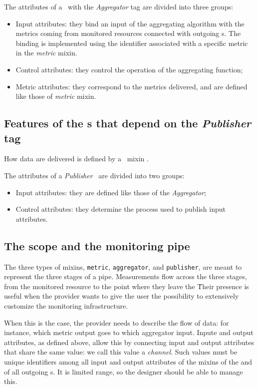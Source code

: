 \documentclass[10pt,a4paper]{article}
\begin{document}
The attributes of a \mi\ with the {\em Aggregator} tag are divided into three groups:

\begin{itemize}

\item Input attributes: they bind an input of the aggregating algorithm with the metrics coming from monitored resources connected with outgoing \coll s. The binding is implemented using the identifier associated with a specific metric in the {\em metric} mixin.
\item Control attributes: they control the operation of the aggregating function;
\item Metric attributes: they correspond to the metrics delivered, and are defined like those of {\em metric} mixin.
\end{itemize}

\subsection{Features of the \mi s that depend on the {\em Publisher} tag \label{sec:publisher}}

How data are delivered is defined by a \publ\ mixin .

The attributes of a {\em Publisher} \mi\ are divided into two groups:

\begin{itemize}
\item Input attributes: they are defined like those of the {\em Aggregator};
\item Control attributes: they determine the process used to publish input attributes.
\end{itemize}

\subsection{The scope and the monitoring pipe}

The three types of mixins, {\tt metric}, {\tt aggregator}, and {\tt publisher}, are meant to represent the three stages of a pipe. Measurements flow across the three stages, from the monitored resource to the point where they leave the \sens\. Their presence is useful when the provider wants to give the user the possibility to extensively customize the monitoring infrastructure.

When this is the case, the provider needs to describe the flow of data: for instance, which metric output goes to which aggregator input. Inpute and output attributes, as defined above, allow this by connecting input and output attributes that share the same value: we call this value a {\em channel}. Such values must be unique identifiers among all input and output attributes of the mixins of the \sens and of all outgoing \coll s. It is limited range, so the designer should be able to manage this.
\end{document}
